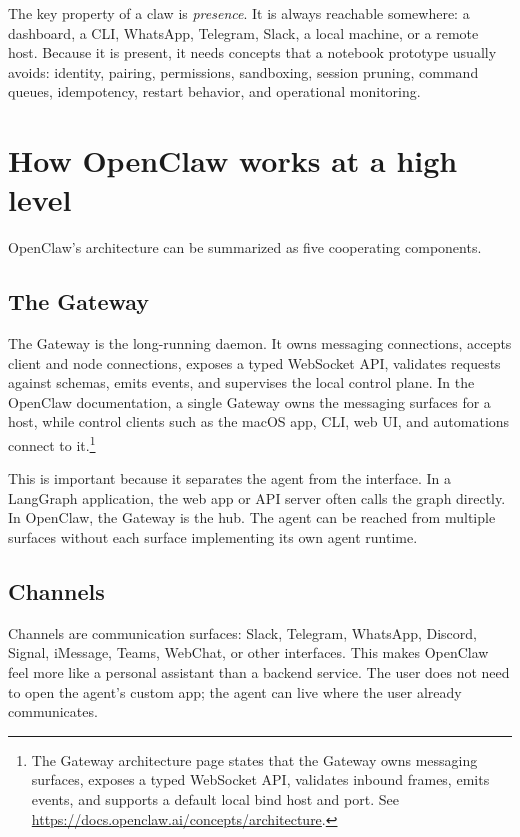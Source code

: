 The key property of a claw is \emph{presence}. It is always reachable somewhere: a dashboard, a CLI, WhatsApp, Telegram, Slack, a local machine, or a remote host. Because it is present, it needs concepts that a notebook prototype usually avoids: identity, pairing, permissions, sandboxing, session pruning, command queues, idempotency, restart behavior, and operational monitoring.

\section{How OpenClaw works at a high level}

OpenClaw's architecture can be summarized as five cooperating components.

\subsection{The Gateway}

The Gateway is the long-running daemon. It owns messaging connections, accepts client and node connections, exposes a typed WebSocket API, validates requests against schemas, emits events, and supervises the local control plane. In the OpenClaw documentation, a single Gateway owns the messaging surfaces for a host, while control clients such as the macOS app, CLI, web UI, and automations connect to it.\footnote{The Gateway architecture page states that the Gateway owns messaging surfaces, exposes a typed WebSocket API, validates inbound frames, emits events, and supports a default local bind host and port. See \url{https://docs.openclaw.ai/concepts/architecture}.}

This is important because it separates the agent from the interface. In a LangGraph application, the web app or API server often calls the graph directly. In OpenClaw, the Gateway is the hub. The agent can be reached from multiple surfaces without each surface implementing its own agent runtime.

\subsection{Channels}

Channels are communication surfaces: Slack, Telegram, WhatsApp, Discord, Signal, iMessage, Teams, WebChat, or other interfaces. This makes OpenClaw feel more like a personal assistant than a backend service. The user does not need to open the agent's custom app; the agent can live where the user already communicates.

